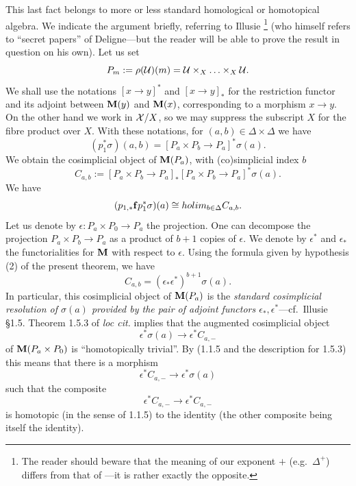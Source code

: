 This last fact belongs to more or less standard homological or homotopical
algebra. We indicate the argument briefly, referring to Illusie
\cite{Illusie}
\footnote{
The reader should beware that the meaning of
our exponent $+$ (e.g.\ $\Delta
^+$) differs from that of \cite{Illusie}---it is
rather exactly the opposite.}
(who himself refers to ``secret
papers'' of Deligne---but the reader will be able to prove the result in
question on his own). Let us set $$
P_m:= \rho ({\cal U} )(m) = {\cal U} \times _X\ldots \times _X {\cal U} .
$$
We shall use the notations $[x\rightarrow y]^{\ast}$ and
$[x\rightarrow y]_{\ast}$ for the restriction functor and its adjoint
between ${\bf M} (y)$ and ${\bf M} (x)$,
corresponding to a morphism $x\rightarrow y$. On the other
hand we work in ${\cal X} /X$, so we may suppress the subscript $X$ for the
fibre product over $X$.
With these notations, for $(a,b)\in \Delta \times \Delta$ we have
$$
(p_1^{\ast} \sigma )(a,b)=
[P_a \times P_b \rightarrow P_a]^{\ast} \sigma (a).
$$
We obtain the cosimplicial object of ${\bf M} (P_a)$, with (co)simplicial index
$b$
$$
C_{a,b}:= [P_a \times P_b \rightarrow P_a]_{\ast}
[P_a \times P_b \rightarrow P_a]^{\ast}\sigma (a).
$$
We have
$$
(p _{1,\ast} {\bf f}p_1^{\ast} \sigma )(a)\cong
holim _{b\in \Delta} C_{a,b}.
$$
Let us denote by $\epsilon : P_a\times P_0 \rightarrow P_a$
the projection. One can decompose
the projection $P_a\times P_b\rightarrow P_a$ as a product of $b+1$ copies of
$\epsilon$. We denote by $\epsilon ^{\ast}$ and $\epsilon _{\ast}$ the
functorialities for ${\bf M}$ with respect to
$\epsilon$. Using the formula
given by hypothesis (2) of the present theorem, we have
$$
C_{a,b} = (\epsilon _{\ast} \epsilon ^{\ast} )^{b+1}\sigma (a).
$$
In particular, this cosimplicial object of ${\bf M} (P_a)$ is the {\em standard
cosimplicial resolution of $\sigma (a)$ provided by the pair of adjoint
functors $\epsilon _{\ast}, \epsilon ^{\ast}$}---cf.\ Illusie \cite{Illusie}
\S 1.5. Theorem 1.5.3 of {\em loc cit.} implies that
the augmented cosimplicial object
$$
\epsilon ^{\ast} \sigma (a) \rightarrow \epsilon ^{\ast} C_{a,-}
$$
of ${\bf M} (P_a\times P_0)$ is ``homotopically trivial''.
By \cite{Illusie} (1.1.5 and the description for 1.5.3) this means
that there is a morphism
$$
\epsilon ^{\ast} C_{a,-}\rightarrow \epsilon ^{\ast} \sigma (a)
$$
such that the composite
$$
\epsilon ^{\ast} C_{a,-}\rightarrow
\epsilon ^{\ast} C_{a,-}
$$
is homotopic (in the sense of \cite{Illusie} 1.1.5) to the identity
(the other composite being itself the identity).

